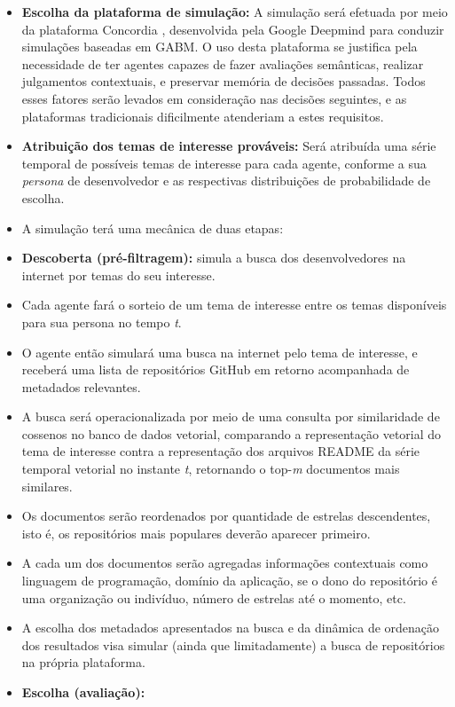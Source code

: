 \documentclass[12pt,oneside,a4paper,brazil,sumario=tradicional]{abntex2}
\begin{document}
\begin{itemize}
  \item \textbf{Escolha da plataforma de simulação:} A simulação será efetuada por meio da plataforma Concordia \parencite{vezhnevets2023}, desenvolvida pela Google Deepmind para conduzir simulações baseadas em GABM. O uso desta plataforma se justifica pela necessidade de ter agentes capazes de fazer avaliações semânticas, realizar julgamentos contextuais, e preservar memória de decisões passadas. Todos esses fatores serão levados em consideração nas decisões seguintes, e as plataformas tradicionais dificilmente atenderiam a estes requisitos.
  \item \textbf{Atribuição dos temas de interesse prováveis:} Será atribuída uma série temporal de possíveis temas de interesse para cada agente, conforme a sua \textit{persona }de desenvolvedor e as respectivas distribuições de probabilidade de escolha.
  \item A simulação terá uma mecânica de duas etapas:
  \item \textbf{Descoberta (pré-filtragem):} simula a busca dos desenvolvedores na internet por temas do seu interesse.
  \item Cada agente fará o sorteio de um tema de interesse entre os temas disponíveis para sua persona no tempo \textit{t}.
  \item O agente então simulará uma busca na internet pelo tema de interesse, e receberá uma lista de repositórios GitHub em retorno acompanhada de metadados relevantes.
  \item A busca será operacionalizada por meio de uma consulta por similaridade de cossenos no banco de dados vetorial, comparando a representação vetorial do tema de interesse contra a representação dos arquivos README da série temporal vetorial no instante \textit{t}, retornando o top-\textit{m }documentos mais similares.
  \item Os documentos serão reordenados por quantidade de estrelas descendentes, isto é, os repositórios mais populares deverão aparecer primeiro.
  \item A cada um dos documentos serão agregadas informações contextuais como linguagem de programação, domínio da aplicação, se o dono do repositório é uma organização ou indivíduo, número de estrelas até o momento, etc.
  \item A escolha dos metadados apresentados na busca e da dinâmica de ordenação dos resultados visa simular (ainda que limitadamente) a busca de repositórios na própria plataforma.
  \item \textbf{Escolha (avaliação):}

\end{itemize}
\end{document}
